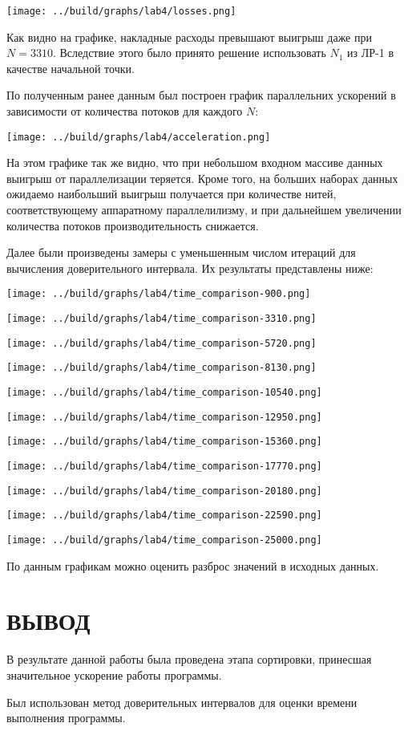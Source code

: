 \documentclass[14pt, a4paper, oneside, final]{extarticle}
\begin{document}
\texttt{[image: ../build/graphs/lab4/losses.png]}

Как видно на графике, накладные расходы превышают выигрыш даже при $N=3310$. Вследствие этого было принято решение использовать $N_1$ из ЛР-1 в качестве начальной точки.

По полученным ранее данным был построен график параллельних ускорений в зависимости от количества потоков для каждого $N$:

\texttt{[image: ../build/graphs/lab4/acceleration.png]}

На этом графике так же видно, что при небольшом входном массиве данных выигрыш от параллелизации теряется. Кроме того, на больших наборах данных ожидаемо наибольший выигрыш получается при количестве нитей, соответствующему аппаратному параллелилизму, и при дальнейшем увеличении количества потоков производительность снижается.

Далее были произведены замеры с уменьшенным числом итераций для вычисления доверительного интервала. Их результаты представлены ниже:

\texttt{[image: ../build/graphs/lab4/time\_comparison-900.png]}

\texttt{[image: ../build/graphs/lab4/time\_comparison-3310.png]}

\texttt{[image: ../build/graphs/lab4/time\_comparison-5720.png]}

\texttt{[image: ../build/graphs/lab4/time\_comparison-8130.png]}

\texttt{[image: ../build/graphs/lab4/time\_comparison-10540.png]}

\texttt{[image: ../build/graphs/lab4/time\_comparison-12950.png]}

\texttt{[image: ../build/graphs/lab4/time\_comparison-15360.png]}

\texttt{[image: ../build/graphs/lab4/time\_comparison-17770.png]}

\texttt{[image: ../build/graphs/lab4/time\_comparison-20180.png]}

\texttt{[image: ../build/graphs/lab4/time\_comparison-22590.png]}

\texttt{[image: ../build/graphs/lab4/time\_comparison-25000.png]}

По данным графикам можно оценить разброс значений в исходных данных.
\clearpage
\section*{ВЫВОД}

В результате данной работы была проведена этапа сортировки, принесшая значительное ускорение работы программы.

Был использован метод доверительных интервалов для оценки времени выполнения программы.
\end{document}
